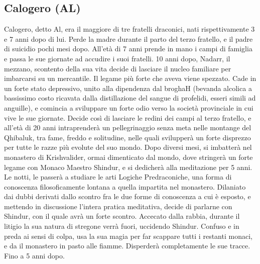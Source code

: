 \documentclass{article}
\begin{document}
          \subsection{Calogero (AL) }
Calogero, detto Al, era il maggiore di tre fratelli draconici, nati rispettivamente 3 e 7 anni dopo di lui. Perde la madre durante il parto del terzo fratello, e il padre di suicidio pochi mesi dopo. All’età di 7 anni prende in mano i campi di famiglia e passa le sue giornate ad accudire i suoi fratelli. 10 anni dopo, Nadarr, il mezzano, scontento della sua vita decide di lasciare il nucleo familiare per imbarcarsi su un mercantile.  Il legame più forte che aveva viene spezzato. Cade in un forte stato depressivo, unito alla dipendenza dal broghaH (bevanda alcolica a bassissimo costo ricavata dalla distillazione del sangue di profelidi, esseri simili ad anguille), e comincia a sviluppare un forte odio verso la società provinciale in cui vive le sue giornate. Decide così di lasciare le redini dei campi al terzo fratello, e all’età di 20 anni intraprenderà un pellegrinaggio senza meta nelle montange del Qhibaluk, tra fame, freddo e solitudine, nelle quali svilupperà un forte disprezzo per tutte le razze più evolute del suo mondo. Dopo diversi mesi, si imbatterà nel monastero di Krishvalider, ormai dimenticato dal mondo, dove stringerà un forte legame con Monaco Maestro Shindur, e si dedicherà alla meditazione per 5 anni.  Le notti, le passerà a studiare le arti Logiche Predraconiche, una forma di conoscenza filosoficamente lontana a quella impartita nel monastero.  Dilaniato dai dubbi derivati dallo scontro fra le due forme di conoscenza a cui è esposto, e mettendo in discussione l’intera pratica meditativa, decide di parlarne con Shindur, con il quale avrà un forte scontro. Accecato dalla rabbia, durante il litigio la sua natura di stregone verrà fuori, uccidendo Shindur.  Confuso e in preda ai sensi di colpa, usa la sua magia per far scappare tutti i restanti monaci, e da il monastero in pasto alle fiamme. Disperderà completamente le sue tracce. Fino a 5 anni dopo.
\end{document}
